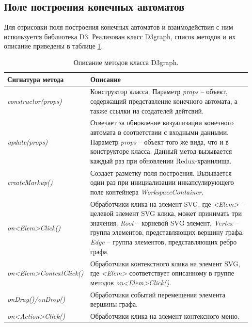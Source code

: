 \subsection{Поле построения конечных автоматов} \label{sec:d3_impl}

Для отрисовки поля построения конечных автоматов и взаимодействия с ним используется библиотека D3. Реализован класс D3graph, список методов и их описание приведены в таблице \ref{tab:d3}.

\begin{table}[ht]
	\caption{Описание методов класса D3graph.}\label{tab:d3}
	\centering
	\begin{tabular}{|m{4 cm}|m{6 cm}|}
		\hline
		\textbf{Сигнатура метода} & \textbf{Описание} \\
		\hline
		
		\textit{constructor(props)} & Конструктор класса. Параметр \textit{props} -- объект, содержащий представление конечного автомата, а также ссылки на создателей дейтсвий.\\
		
		\hline
		
		\textit{update(props)} & Отвечает за обновление визуализации конечного автомата в соответствии с входными данными. Параметр \textit{props} -- объект того же вида, что и в конструкторе класса. Данный метод вызывается каждый раз при обновлении Redux-хранилища.\\
		
		\hline
		
		\textit{createMarkup()} & Создает разметку поля построения. Вызывается один раз при инициализации инкапсулирующего поле контейнера  \textit{WorkspaceContainer}. \\
		
		\hline
		
		\textit{on<Elem>Click()} & Обработчики клика на элемент SVG, где \textit{<Elem>} -- целевой элемент SVG клика, может принимать три значения: \textit{Root} -- корневой SVG элемент, \textit{Vertex} -- группа элементов, представляющих вершину графа, \textit{Edge} -- группа элементов, представляющих ребро графа.\\
		
		\hline
		
		\textit{on<Elem>ContextClick()} & Обработчики контекстного клика на элемент SVG, где \textit{<Elem>} соответствует описанному в группе методов \textit{on<Elem>Click()}.\\
		
		\hline
		
		\textit{onDrag()/onDrop()} & Обработчики событий перемещения элемента вершины графа. \\
		
		\hline
		
		\textit{on<Action>Click()} & Обработчики клика на элемент контексного меню. \\
		
		\hline
	\end{tabular}
\end{table}

